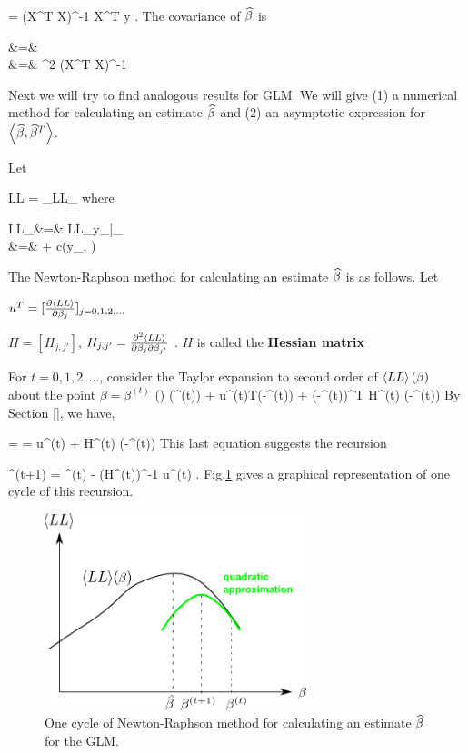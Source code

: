 \beq
\HAT{\beta}=
(X^T X)^{-1} X^T y
\;.
\eeq
The covariance of $\widehat{\beta}$ is

\beqa
{}
&=&
\\
&=&
\s^2  (X^T X)^{-1}
\eeqa

Next
we will try to find analogous results for GLM.
We will give (1) a numerical method
for calculating an estimate
$\widehat{\beta}$
and (2) an asymptotic
expression for
$\left\langle\widehat{\beta}, \widehat{\beta}^T\right\rangle$.

Let

\beq
 LL =  \sum_\s  LL_\s
\eeq
where

\beqa
 LL_\s &=&   LL_{y_\s|\theta_\s }
\\
&=&
 + c(y_\s, \phi)
\eeqa

The
Newton-Raphson method for calculating an
estimate $\widehat{\beta}$ is as follows. Let

$u^T = [\frac{\partial\left\langle LL\right\rangle}{\partial\beta_j}]_{j=0,1,2, \ldots}$

 $H= [H_{j, j'}]$, $H_{j, j'} =
\frac{\partial^2 \left\langle LL\right\rangle }{\partial\beta_j\partial\beta_{j'}}$ .
$H$ is called the {\bf Hessian matrix}

For $t=0, 1, 2,\ldots$, consider the
Taylor expansion  to second order
of $\left\langle LL\right\rangle(\beta)$  about  the
point $\beta= \beta^{(t)}$
\beq
{}(\beta)
\approx
{}(\beta^{(t)})
+ u^{(t)T}(\beta-\beta^{(t)})
+ 
(\beta-\beta^{(t)})^T H^{(t)} (\beta-\beta^{(t)})
\eeq
 By Section [], we have,

 =
=
u^{(t)}
+
H^{(t)} (\beta-\beta^{(t)})
\eeq
This last equation suggests the recursion

\beq
\beta^{(t+1)} =
\beta^{(t)} -  (H^{(t)})^{-1} u^{(t)}
\;.
\eeq
Fig.\ref{fig-gml-new-rap}
gives a graphical
representation of
one cycle of this recursion.


\begin{figure}[h!]
\centering
\includegraphics[width=3in]
{gen-lin-mod/gen-lin-mod.png}
\caption{One cycle of Newton-Raphson method
for calculating an estimate $\widehat{\beta}$ for the GLM.}
\label{fig-gml-new-rap}
\end{figure}




